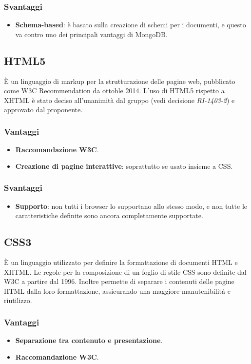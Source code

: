 \subsubsection{Svantaggi}
\begin{itemize}
\item \textbf{Schema-based}: \`e basato sulla creazione di schemi per i documenti, e questo va contro uno dei principali vantaggi di MongoDB.
\end{itemize}
\subsection{HTML5}
\`E un linguaggio di markup per la strutturazione delle pagine web, pubblicato come W3C Recommendation da ottoble 2014. L'uso di HTML5 rispetto a XHTML \`e stato deciso all'unanimit\`a dal gruppo (vedi decisione \textit{RI-1403-2}) e approvato dal proponente.
\subsubsection{Vantaggi}
\begin{itemize}
\item \textbf{Raccomandazione W3C}.
\item \textbf{Creazione di pagine interattive}: soprattutto se usato insieme a CSS.
\end{itemize}
\subsubsection{Svantaggi}
\begin{itemize}
\item \textbf{Supporto}: non tutti i browser lo supportano allo stesso modo, e non tutte le caratteristiche definite sono ancora completamente supportate.
\end{itemize}
\subsection{CSS3}
\`E un linguaggio utilizzato per definire la formattazione di documenti HTML e XHTML. Le regole per la composizione di un foglio di stile CSS sono definite dal W3C a partire dal 1996. Inoltre permette di separare i contenuti delle pagine HTML dalla loro formattazione, assicurando una maggiore manutenibilit\`a e riutilizzo.
\subsubsection{Vantaggi}
\begin{itemize}
\item \textbf{Separazione tra contenuto e presentazione}.
\item \textbf{Raccomandazione W3C}.
\end{itemize}
